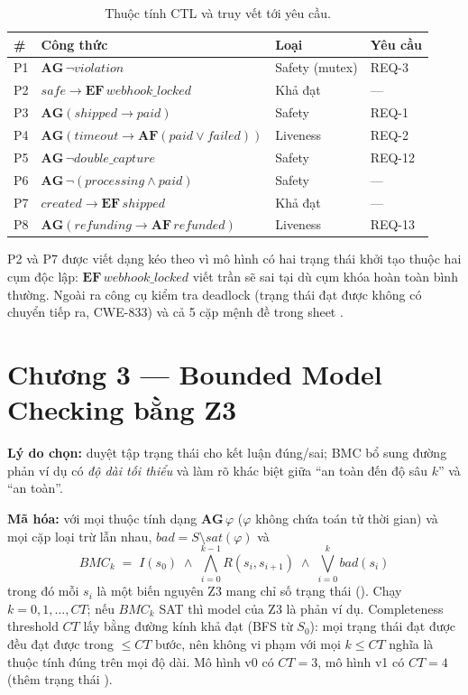 \begin{table}[H]
\centering\small
\caption{Thuộc tính CTL và truy vết tới yêu cầu.}
\label{tab:ctlprops}
\begin{tabularx}{\linewidth}{@{}l X l l@{}}
\toprule
\# & Công thức & Loại & Yêu cầu \\
\midrule
P1 & $\mathbf{AG}\,\neg\mathit{violation}$ & Safety (mutex) & REQ-3 \\
P2 & $\mathit{safe} \rightarrow \mathbf{EF}\,\mathit{webhook\_locked}$ & Khả đạt & — \\
P3 & $\mathbf{AG}(\mathit{shipped} \rightarrow \mathit{paid})$ & Safety & REQ-1 \\
P4 & $\mathbf{AG}(\mathit{timeout} \rightarrow \mathbf{AF}(\mathit{paid} \vee \mathit{failed}))$ & Liveness & REQ-2 \\
P5 & $\mathbf{AG}\,\neg\mathit{double\_capture}$ & Safety & REQ-12 \\
P6 & $\mathbf{AG}\,\neg(\mathit{processing} \wedge \mathit{paid})$ & Safety & — \\
P7 & $\mathit{created} \rightarrow \mathbf{EF}\,\mathit{shipped}$ & Khả đạt & — \\
P8 & $\mathbf{AG}(\mathit{refunding} \rightarrow \mathbf{AF}\,\mathit{refunded})$ & Liveness & REQ-13 \\
\bottomrule
\end{tabularx}
\end{table}
P2 và P7 được viết dạng kéo theo vì mô hình có hai trạng thái khởi tạo thuộc hai cụm độc lập:
$\mathbf{EF}\,\mathit{webhook\_locked}$ viết trần sẽ sai tại  dù cụm khóa hoàn
toàn bình thường. Ngoài ra công cụ kiểm tra deadlock (trạng thái đạt được không có chuyển tiếp
ra, CWE-833) và cả 5 cặp mệnh đề trong sheet .

\section{Chương 3 — Bounded Model Checking bằng Z3}
\textbf{Lý do chọn:} duyệt tập trạng thái cho kết luận đúng/sai; BMC bổ sung đường phản ví dụ
có \emph{độ dài tối thiểu} và làm rõ khác biệt giữa ``an toàn đến độ sâu $k$'' và ``an toàn''.

\textbf{Mã hóa:} với mọi thuộc tính dạng $\mathbf{AG}\,\varphi$ ($\varphi$ không chứa toán tử
thời gian) và mọi cặp loại trừ lẫn nhau, $\mathit{bad} = S \setminus \mathit{sat}(\varphi)$ và
\begin{equation}
  \mathit{BMC}_k \;=\; I(s_0) \;\wedge\; \bigwedge_{i=0}^{k-1} R(s_i,s_{i+1}) \;\wedge\; \bigvee_{i=0}^{k} \mathit{bad}(s_i)
\end{equation}
trong đó mỗi $s_i$ là một biến nguyên Z3 mang chỉ số trạng thái (). Chạy
$k = 0, 1, \ldots, CT$; nếu $\mathit{BMC}_k$ SAT thì model của Z3 là phản ví dụ.
Completeness threshold $CT$ lấy bằng đường kính khả đạt (BFS từ $S_0$): mọi trạng thái đạt được
đều đạt được trong $\leq CT$ bước, nên không vi phạm với mọi $k \le CT$ nghĩa là thuộc tính
đúng trên mọi độ dài. Mô hình v0 có $CT = 3$, mô hình v1 có $CT = 4$ (thêm trạng thái ).

